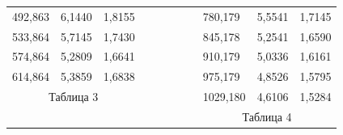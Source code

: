 \documentclass[a4paper,12pt]{article} %
\begin{document}
\begin{enumerate}
\begin{table}[h!]
\begin{tabular}{lllccccclll}
		\multicolumn{1}{|l|}{492,863} & \multicolumn{1}{l|}{6,1440}  & \multicolumn{1}{l|}{1,8155}   &                      &                      &                      &                      & \multicolumn{1}{c|}{} & \multicolumn{1}{l|}{780,179} & \multicolumn{1}{l|}{5,5541}  & \multicolumn{1}{l|}{1,7145}   \\ \cline{1-3} \cline{9-11} 
		\multicolumn{1}{|l|}{533,864} & \multicolumn{1}{l|}{5,7145}  & \multicolumn{1}{l|}{1,7430}   &                      &                      &                      &                      & \multicolumn{1}{c|}{} & \multicolumn{1}{l|}{845,178} & \multicolumn{1}{l|}{5,2541}  & \multicolumn{1}{l|}{1,6590}   \\ \cline{1-3} \cline{9-11} 
		\multicolumn{1}{|l|}{574,864} & \multicolumn{1}{l|}{5,2809}  & \multicolumn{1}{l|}{1,6641}   &                      &                      &                      &                      & \multicolumn{1}{c|}{} & \multicolumn{1}{l|}{910,179} & \multicolumn{1}{l|}{5,0336}  & \multicolumn{1}{l|}{1,6161}   \\ \cline{1-3} \cline{9-11} 
		\multicolumn{1}{|l|}{614,864} & \multicolumn{1}{l|}{5,3859}  & \multicolumn{1}{l|}{1,6838}   &                      &                      &                      &                      & \multicolumn{1}{c|}{} & \multicolumn{1}{l|}{975,179} & \multicolumn{1}{l|}{4,8526}  & \multicolumn{1}{l|}{1,5795}   \\ \cline{1-3} \cline{9-11} 
		\multicolumn{3}{c}{Таблица 3}                                                                &                      &                      &                      &                      & \multicolumn{1}{c|}{} & \multicolumn{1}{l|}{1029,180} & \multicolumn{1}{l|}{4,6106}  & \multicolumn{1}{l|}{1,5284}   \\ \cline{9-11} 
		&                              &                               & \multicolumn{1}{l}{} & \multicolumn{1}{l}{} & \multicolumn{1}{l}{} & \multicolumn{1}{l}{} & \multicolumn{1}{l}{}  & \multicolumn{3}{c}{Таблица 4}                                                              
	\end{tabular}
\end{table}

\newpage


\end{enumerate}
\end{document}
